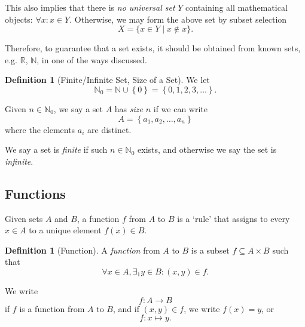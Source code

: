 \documentclass{article}
\theoremstyle{definition}
\newtheorem{definition}[theorem]{Definition}
\theoremstyle{remark}
\newcommand{\pqty}[1]{\left(#1\right)}
\newcommand{\Bqty}[1]{\left\{#1\right\}}
\newcommand{\set}[2]{\{#1\mid #2\}}
\newcommand{\functiondomain}[3]{#1:#2\to #3}
\newcommand{\functionmap}[3]{#1:#2\mapsto #3}
\newcommand{\NN}{\mathbb{N}}
\newcommand{\RR}{\mathbb{R}}
\begin{document}
This also implies that there is \emph{no universal set} \(Y\) containing all mathematical objects: \(\forall x: x \in Y\). Otherwise, we may form the above set by subset selection
\[
    X = \set{x \in Y}{x \notin x}.
\]

Therefore, to guarantee that a set exists, it should be obtained from known sets, e.g. \(\RR\), \(\NN\), in one of the ways discussed.

\begin{definition}[Finite/Infinite Set, Size of a Set]
    We let
    \[
        \NN_0 = \NN \cup \Bqty{0} = \Bqty{0, 1, 2, 3, \ldots}.
    \]

    Given \(n \in \NN_0\), we say a set \(A\) has \emph{size} \(n\) if we can write
    \[
        A = \Bqty{a_1, a_2, \ldots, a_n}
    \]
    where the elements \(a_i\) are distinct.

    We say a set is \emph{finite} if such \(n \in \NN_0\) exists, and otherwise we say the set is \emph{infinite}.
\end{definition}

\subsection{Functions}
\label{sec:functions}

Given sets \(A\) and \(B\), a function \(f\) from \(A\) to \(B\) is a `rule' that assigns to every \(x \in A\) to a unique element \(f\pqty{x} \in B\).

\begin{definition}[Function]
    A \emph{function} from \(A\) to \(B\) is a subset \(f \subseteq A \times B\) such that
    \[
        \forall x \in A, \exists_1 y \in B: \pqty{x, y} \in f.
    \]

    We write
    \[
        \functiondomain{f}{A}{B}
    \]
    if \(f\) is a function from \(A\) to \(B\), and if \(\pqty{x, y} \in f\), we write \(f\pqty{x} = y\), or
    \[
        \functionmap{f}{x}{y}.
    \]
\end{definition}
\end{document}
